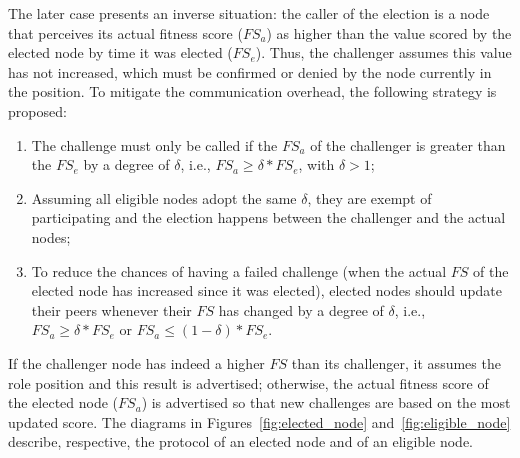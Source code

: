 The later case presents an inverse situation: the caller of the election is a node that perceives its actual fitness score ($FS_a$) as higher than the value scored by the elected node by time it was elected ($FS_e$). Thus, the challenger assumes this value has not increased, which must be confirmed or denied by the node currently in the position. To mitigate the communication overhead, the following strategy is proposed:

\begin{enumerate}

\item The challenge must only be called if the $FS_a$ of the challenger is greater than the $FS_e$ by a degree of $\delta$, i.e., $FS_a \ge \delta * FS_e$, with $\delta > 1$;

\item Assuming all eligible nodes adopt the same $\delta$, they are exempt of participating and the election happens between the challenger and the actual nodes;

\item To reduce the chances of having a failed challenge (when the actual $FS$ of the elected node has increased since it was elected), elected nodes should update their peers whenever their $FS$ has changed by a degree of $\delta$, i.e., $FS_a \ge \delta * FS_e$ or $FS_a \le (1 - \delta) * FS_e$.

\end{enumerate}

If the challenger node has indeed a higher $FS$ than its challenger, it assumes the role position and this result is advertised; otherwise, the actual fitness score of the elected node ($FS_a$) is advertised so that new challenges are based on the most updated score. The diagrams in Figures~\ref{fig:elected_node} and~\ref{fig:eligible_node} describe, respective, the protocol of an elected node and of an eligible node.
